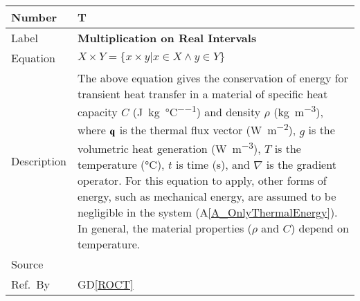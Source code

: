 \documentclass[12pt]{article}
\newcommand{\colAwidth}{0.13\textwidth}
\newcommand{\colBwidth}{0.82\textwidth}
\newcommand{\dref}[1]{GD\ref{#1}}
\newcounter{theorynum} %
\newcommand{\aref}[1]{A\ref{#1}}
\begin{document}
\noindent
\begin{minipage}{\textwidth}
	\renewcommand*{\arraystretch}{1.5}
	\begin{tabular}{| p{\colAwidth} | p{\colBwidth}|}
		\hline
		\rowcolor[gray]{0.9}
		Number& T{theorynum}\thetheorynum 
		\label{T_multiplication}\\
		\hline
		Label&\bf Multiplication on Real Intervals\\
		\hline
		Equation&  $X \times Y = \{x \times y | x \in X \wedge y \in Y\}$\\
		\hline
		Description & 
		The above equation gives the conservation of energy for transient heat 
		transfer in a material
		of specific heat capacity $C$ (\si{\joule\per\kilogram\per\celsius}) 
		and density $\rho$ 
		(\si{\kilogram\per\cubic\metre}), where $\bf q$ is the thermal flux 
		vector (\si{\watt\per\square\metre}),
		$g$ is the volumetric heat generation
		(\si{\watt\per\cubic\metre}), $T$ is the temperature
		(\si{\celsius}),  $t$ is time (\si{\second}), and $\nabla$ is
		the gradient operator.  For this equation to apply, other forms
		of energy, such as mechanical energy, are assumed to be negligible in 
		the
		system (\aref{A_OnlyThermalEnergy}).  In general, the material 
		properties ($\rho$ and $C$) depend on temperature.\\
		\hline
		Source & \citet{intervalarithmetic}\\
		\hline
		Ref.\ By & \dref{ROCT}\\
		\hline
	\end{tabular}
\end{minipage}\\

~\newline
\end{document}
